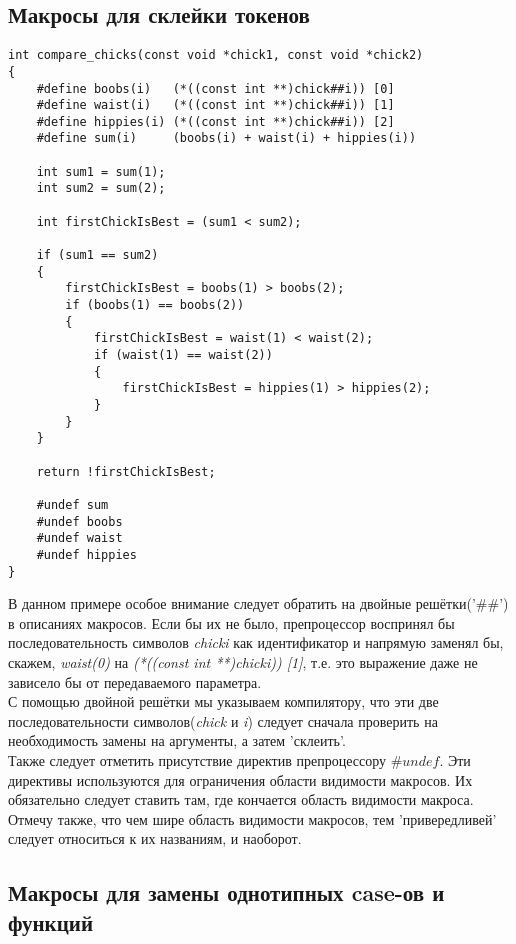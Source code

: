 \documentclass[a4paper]{article}
\begin{document}
\subsection{Макросы для склейки токенов}
	\begin{lstlisting}[caption={Склейка токенов макросами}]
int compare_chicks(const void *chick1, const void *chick2)
{
    #define boobs(i)   (*((const int **)chick##i)) [0]
    #define waist(i)   (*((const int **)chick##i)) [1]
    #define hippies(i) (*((const int **)chick##i)) [2]
    #define sum(i)     (boobs(i) + waist(i) + hippies(i))
    
    int sum1 = sum(1);
    int sum2 = sum(2);
    
    int firstChickIsBest = (sum1 < sum2);

    if (sum1 == sum2)
    {
        firstChickIsBest = boobs(1) > boobs(2);
        if (boobs(1) == boobs(2))
        {
            firstChickIsBest = waist(1) < waist(2);
            if (waist(1) == waist(2))
            {
                firstChickIsBest = hippies(1) > hippies(2);
            }
        }
    }
    
    return !firstChickIsBest;
    
    #undef sum
    #undef boobs
    #undef waist
    #undef hippies
}
	\end{lstlisting} 
	В данном примере особое внимание следует обратить на двойные решётки('$\#\#$') в описаниях макросов. Если бы их не было, препроцессор воспринял бы последовательность символов \textit{chicki} как идентификатор и напрямую заменял бы, скажем, \textit{waist(0)} на \textit{(*((const int **)chicki)) [1]}, т.е. это выражение даже не зависело бы от передаваемого параметра. \\
	С помощью двойной решётки мы указываем компилятору, что эти две последовательности символов(\textit{chick} и \textit{i}) следует сначала проверить на необходимость замены на аргументы, а затем 'склеить'.\\
	Также следует отметить присутствие директив препроцессору $\#undef$. Эти директивы используются для ограничения области видимости макросов. Их обязательно следует ставить там, где кончается область видимости макроса. \\
	Отмечу также, что чем шире область видимости макросов, тем 'привередливей' следует относиться к их названиям, и наоборот.
	
\newpage

\subsection{Макросы для замены однотипных case-ов и функций}
\end{document}
